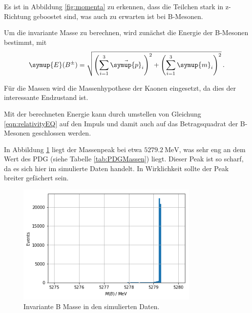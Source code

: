 Es ist in Abbildung \ref{fig:momenta} zu erkennen, dass die Teilchen stark in z-Richtung geboostet sind, was auch zu erwarten ist bei B-Mesonen.

Um die invariante Masse zu berechnen, wird zun\"achst die Energie der B-Mesonen bestimmt, mit
\begin{equation}
  \symup{E}(B^{\pm}) =
  \sqrt{\left(\sum_{i = 1}^{3} \vec{\symup{p}}_i\right)^2 + \left(\sum_{i = 1}^{3} \symup{m}_i\right)^2} \, .
\end{equation}

F\"ur die Massen wird die Massenhypothese der Kaonen eingesetzt, da dies der interessante Endzustand ist.

Mit der berechneten Energie kann durch umstellen von Gleichung \eqref{eqn:relativityEQ} auf den Impuls und damit auch auf das Betragsquadrat der B-Mesonen geschlossen werden.

In Abbildung \ref{fig:invMassB} liegt der Massenpeak bei etwa $\SI{5279.2}{\mega\electronvolt}$, was sehr eng an dem Wert des PDG (siehe Tabelle \ref{tab:PDGMassen}) liegt.
Dieser Peak ist so scharf, da es sich hier im simulierte Daten handelt. In Wirklichkeit sollte der Peak breiter gefächert sein.

\begin{figure}[!htb]
  \centering
  \includegraphics[width=0.8\textwidth]{plots/sim_inv_masse_B.png}
  \caption{Invariante B Masse in den simulierten Daten.}
  \label{fig:invMassB}
\end{figure}

